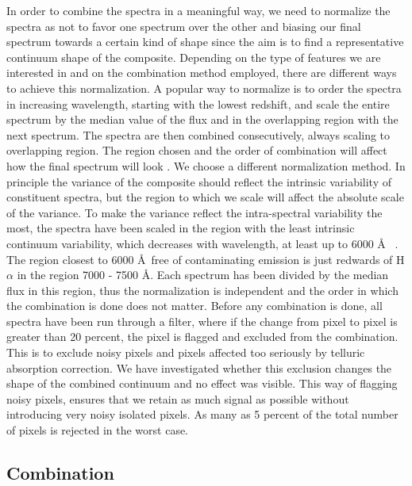 \documentclass{aa}    %
\newcommand{\sectlabel}[1]{\label{sect:#1}}
\begin{document}
In order to combine the spectra in a meaningful way, we need to normalize the spectra as not to favor one spectrum over the other and biasing our final spectrum towards a certain kind of shape since the aim is to find a representative continuum shape of the composite. Depending on the type of features we are interested in and on the combination method employed, there are different ways to achieve this normalization. A popular way to normalize is to order the spectra in increasing wavelength, starting with the lowest redshift, and scale the entire spectrum by the median value of the flux and in the overlapping region with the next spectrum. The spectra are then combined consecutively, always scaling to overlapping region. The region chosen and the order of combination will affect how the final spectrum will look \citep{Francis1991,Brotherton2000,VandenBerk2001,Glikman2006}. We choose a different normalization method. In principle the variance of the composite should reflect the intrinsic variability of constituent spectra, but the region to which we scale will affect the absolute scale of the variance. To make the variance reflect the intra-spectral variability the most, the spectra have been scaled in the region with the least intrinsic continuum variability, which decreases with wavelength, at least up to 6000 \AA~ \citep{VandenBerk2004}. The region closest to 6000 \AA~free of contaminating emission is just redwards of H$\alpha$ in the region 7000 - 7500 \AA. Each spectrum has been divided by the median flux in this region, thus the normalization is independent and the order in which the combination is done does not matter. 
Before any combination is done, all spectra have been run through a filter, where if the change from pixel to pixel is greater than 20 percent, the pixel is flagged and excluded from the combination. This is to exclude noisy pixels and pixels affected too seriously by telluric absorption correction. We have investigated whether this exclusion changes the shape of the combined continuum and no effect was visible. This way of flagging noisy pixels, ensures that we retain as much signal as possible without introducing very noisy isolated pixels. As many as 5 percent of the total number of pixels is rejected in the worst case. 

\subsection{Combination}  \sectlabel{combine}
\end{document}
